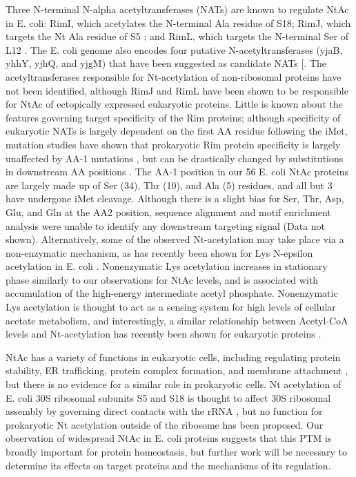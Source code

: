 \documentclass[12pt]{article}
\begin{document}
Three N-terminal N-alpha acetyltransferases (NATs) are known to regulate NtAc in E. coli: RimI, which acetylates the N-terminal Ala residue of S18; RimJ, which targets the Nt Ala residue of S5  \cite{Yoshikawaetal1987}; and RimL, which targets the N-terminal Ser of L12  \cite{Tanakaetal1989}. The E. coli genome also encodes four putative N-acetyltransferases (yjaB, yhhY, yjhQ, and yjgM) that have been suggested as candidate NATs [\cite{Tanakaetal1989}. The acetyltransferases responsible for Nt-acetylation of non-ribosomal proteins have not been identified, although RimJ  \cite{Bernal-Perezetal2012}\cite{Tanakaetal1989} and RimL \cite{Miaoetal2007} have been shown to be responsible for NtAc of ectopically expressed eukaryotic proteins.  Little is known about the features governing target specificity of the Rim proteins; although specificity of eukaryotic NATs is largely dependent on the first AA residue following the iMet, mutation studies have shown that prokaryotic Rim protein specificity is largely unaffected by AA-1 mutations \cite{Miaoetal2007}, but can be drastically changed by substitutions in downstream AA positions \cite{Charbautetal2002}.  The AA-1 position in our 56 E. coli NtAc proteins are largely made up of Ser (34), Thr (10), and Ala (5) residues, and all but 3 have undergone iMet cleavage.  Although there is a slight bias for Ser, Thr, Asp, Glu, and Gln at the AA2 position, sequence alignment and motif enrichment analysis were unable to identify any downstream targeting signal (Data not shown). Alternatively, some of the observed Nt-acetylation may take place via a non-enzymatic mechanism, as has recently been shown for Lys N-epsilon acetylation in E. coli \cite{Kuhnetal2014} \cite{Weinertetal2013}. Nonenzymatic Lys acetylation increases in stationary phase similarly to our observations for NtAc levels, and is associated with accumulation of the high-energy intermediate acetyl phosphate. Nonenzymatic Lys acetylation is thought to act as a sensing system for high levels of cellular acetate metabolism, and interestingly, a similar relationship between Acetyl-CoA levels and Nt-acetylation has recently been shown for eukaryotic proteins \cite{Yietal2011}. 

NtAc has a variety of functions in eukaryotic cells, including regulating protein stability, ER trafficking, protein complex formation, and membrane attachment \cite{Starheimetal2012}, but there is no evidence for a similar role in prokaryotic cells. Nt acetylation of E. coli 30S ribosomal subunits S5 and S18 is thought to affect 30S ribosomal assembly by governing direct contacts with the rRNA \cite{ClatterbuckSoperetal2013}, but no function for prokaryotic Nt acetylation outside of the ribosome has been proposed. Our observation of widespread NtAc in E. coli proteins suggests that this PTM is broadly important for protein homeostasis, but further work will be necessary to determine its effects on target proteins and the mechanisms of its regulation. 
 
\end{document}

